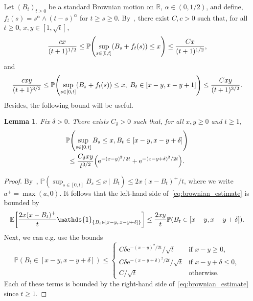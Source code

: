 \documentclass[10pt]{amsart}
\newtheorem{lemm}[theo]{Lemma}\newtheorem{prop}[theo]{Proposition}\newtheorem{coro}[theo]{Corollary}\newtheorem{conj}[theo]{Conjecture}
\theoremstyle{definition}\newtheorem{defi}[theo]{Definition}\newtheorem{rema}[theo]{Remark}\newtheorem{exam}[theo]{Example}\newtheorem{exem}[theo]{Example}\newtheorem{nota}[theo]{Notation}
\newcommand{\e}{\mathrm{e}}
\renewcommand{\P}{\mathbb{P}}
\newcommand{\R}{\mathbb{R}}
\newcommand\1{\mathds{1}}
\newcommand{\Expec}[1]{\mathbb{E}\left[#1\right]}
\let\originalleft\left
\let\originalright\right
\renewcommand{\left}{\mathopen{}\mathclose\bgroup\originalleft}
\renewcommand{\right}{\aftergroup\egroup\originalright}
\begin{document}
Let $(B_t)_{t \geq 0}$ be a standard Brownian motion on $\R$, $\alpha \in (0, 1/2)$, and define, $f_t(s) = s^\alpha \wedge (t - s)^\alpha$ for $t \geq s \geq 0$. By~\cite[Lemma~2.8]{KimLubetzkyZeitouni2023}, there exist $C, c > 0$ such that, for all $t \geq 0$, $x, y \in [1, \sqrt{t}]$,
\begin{equation}\label{eq:ballot_theorem}
\frac{c x}{(t + 1)^{1/2}} \leq \P \left(\sup_{s \in [0, t]} (B_s + f_t(s)) \leq x \right) \leq \frac{C x}{(t + 1)^{1/2}},
\end{equation}
and
\begin{equation}\label{eq:ballot_theorem_plus}
\frac{c x y}{(t + 1)^{3/2}} \leq \P \left(\sup_{s \in [0, t]} (B_s + f_t(s)) \leq x,\; B_t \in [x - y, x - y + 1] \right) \leq \frac{C x y}{(t + 1)^{3/2}}.
\end{equation}
Besides, the following bound will be useful.

\begin{lemm}\label{lem:brownian_estimate}
Fix $\delta > 0$. There exists $C_\delta > 0$ such that, for all $x, y \geq 0$ and $t \geq 1$,
\begin{multline}\label{eq:brownian_estimate}
\P \left(\sup_{s \in [0, t]} B_s \leq x, B_t \in [x - y, x - y + \delta] \right) \\
\leq \frac{C_\delta x y}{t^{3/2}} \left(\e^{-(x - y)^2/2t} + \e^{-(x - y + \delta)^2/2t} \right).
\end{multline}
\end{lemm}

\begin{proof}
By~\cite[Lemma~2]{Bramson1978}, $\P (\sup_{s \in [0, t]} B_s \leq x \mid B_t) \leq 2 x (x - B_t)^+/t$, where we write $a^+ = \max(a, 0)$. It follows that the left-hand side of~\eqref{eq:brownian_estimate} is bounded by
\begin{equation*}
\Expec{\frac{2 x (x - B_t)^+}{t} \1_{\{B_t \in [x - y,\, x - y + \delta]\}}} \leq \frac{2 x y}{t} \P(B_t \in [x - y, x - y + \delta]).
\end{equation*}
Next, we can e.g. use the bounds
\begin{equation*}
\P(B_t \in [x - y, x - y + \delta]) \leq
\begin{cases}
C \delta \e^{-(x - y)^2/2t}/\sqrt{t} & \text{if } x - y \geq 0, \\
C \delta \e^{-(x - y + \delta)^2/2t}/\sqrt{t} & \text{if } x - y + \delta \leq 0, \\
C/\sqrt{t} & \text{otherwise}.
\end{cases}
\end{equation*}
Each of these terms is bounded by the right-hand side of~\eqref{eq:brownian_estimate} since $t \geq 1$.
\end{proof}
\end{document}
